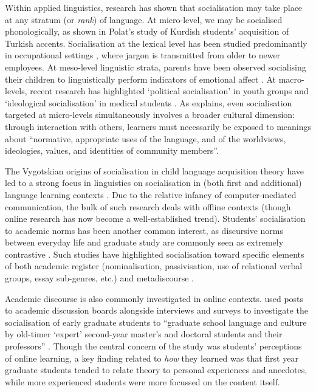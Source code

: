 	  Within applied linguistics, research has shown that socialisation may take place at any stratum (or \emph{rank}) of language. At micro-level, we may be socialised phonologically, as shown in Polat's \citeyear{polat_nature_2011} study of Kurdish students' acquisition of Turkish accents. Socialisation at the lexical level has been studied predominantly in occupational settings \cite[e.g.][]{wolf_learning_1989}, where jargon is transmitted from older to newer employees. At meso-level linguistic strata, parents have been observed socialising their children to linguistically perform indicators of emotional affect \cite{clancy_socialization_1999}. At macro-levels, recent research has highlighted `political socialisation' in youth groups \cite{lee_processes_2013} and `ideological socialisation' in medical students \cite{harter_exploring_2001}. As \textcite[p.~172]{duff_language_2010} explains, even socialisation targeted at micro-levels simultaneously involves a broader cultural dimension: through interaction with others, learners must necessarily be exposed to meanings about ``normative, appropriate uses of the language, and of the worldviews, ideologies, values, and identities of community members''.
	  
	  The Vygotskian origins of socialisation in child language acquisition theory have led to a strong focus in linguistics on socialisation in (both first and additional) language learning contexts \cite{ochs_socialization_1991}. Due to the relative infancy of computer-mediated communication, the bulk of such research deals with offline contexts (though online research has now become a well-established trend). Students' socialisation to academic norms has been another common interest, as discursive norms between everyday life and graduate study are commonly seen as extremely contrastive \cite{beckett_students_2010}. Such studies have highlighted socialisation toward specific elements of both academic register (nominalisation, passivisation, use of relational verbal groups, essay sub-genres, etc.) and metadiscourse \cite{mauranen__2003}.

	  Academic discourse is also commonly investigated in online contexts.  used posts to academic discussion boards alongside interviews and surveys to investigate the socialisation of early graduate students to ``graduate school language and culture by old-timer `expert' second-year master's and doctoral students and their professors'' \citeyear[p.~319]{beckett_students_2010}. Though the central concern of the study was students' perceptions of online learning, a key finding related to \emph{how} they learned was that first year graduate students tended to relate theory to personal experiences and anecdotes, while more experienced students were more focussed on the content itself.

